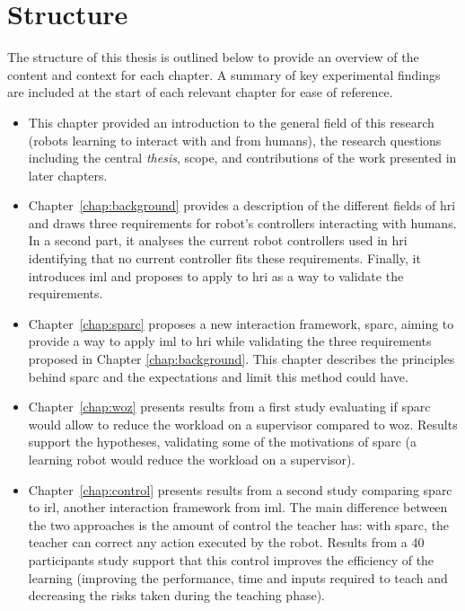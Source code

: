 \section{Structure}\label{sec:intro-struct}
The structure of this thesis is outlined below to provide an overview of the content and context for each chapter. A summary of key experimental findings are included at the start of each relevant chapter for ease of reference. 

\begin{itemize}
	\item This chapter provided an introduction to the general field of this research (robots learning to interact with and from humans), the research questions including the central \emph{thesis}, scope, and contributions of the work presented in later chapters.  

	\item Chapter~\ref{chap:background} provides a description of the different fields of \gls{hri} and draws three requirements for robot's controllers interacting with humans. In a second part, it analyses the current robot controllers used in \gls{hri} identifying that no current controller fits these requirements. Finally, it introduces \gls{iml} and proposes to apply to \gls{hri} as a way to validate the requirements.
	
	\item Chapter~\ref{chap:sparc} proposes a new interaction framework, \gls{sparc}, aiming to provide a way to apply \gls{iml} to \gls{hri} while validating the three requirements proposed in Chapter \ref{chap:background}. This chapter describes the principles behind \gls{sparc} and the expectations and limit this method could have.
	
	\item Chapter~\ref{chap:woz} presents results from a first study evaluating if \gls{sparc} would allow to reduce the workload on a supervisor compared to \gls{woz}. Results support the hypotheses, validating some of the motivations of \gls{sparc} (a learning robot would reduce the workload on a supervisor).
	
	\item Chapter~\ref{chap:control} presents results from a second study comparing \gls{sparc} to \gls{irl}, another interaction framework from \gls{iml}. The main difference between the two approaches is the amount of control the teacher has: with \gls{sparc}, the teacher can correct any action executed by the robot. Results from a 40 participants study support that this control improves the efficiency of the learning (improving the performance, time and inputs required to teach and decreasing the risks taken during the teaching phase).
	

\end{itemize}
